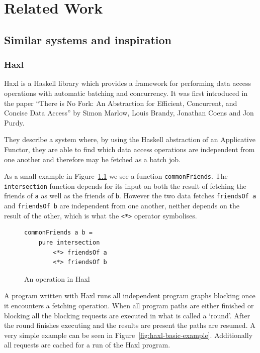 \chapter{Related Work}

\label{ch:related-work}

\section{Similar systems and inspiration}

\subsection{Haxl}

Haxl\cite{Haxl:library:link}\cite{Marlow:2014:NFA:2692915.2628144} is a Haskell\cite{HaskellLanguage} library which provides a framework for performing data access operations with automatic batching and concurrency. It was first introduced in the paper ``There is No Fork: An Abstraction for Efficient, Concurrent, and Concise Data Access''\cite{Marlow:2014:NFA:2692915.2628144} by Simon Marlow, Louis Brandy, Jonathan Coens and Jon Purdy.

They describe a system where, by using the Haskell abstraction of an Applicative Functor\cite{mcbride2008applicative}, they are able to find which data access operations are independent from one another and therefore may be fetched as a batch job.

As a small example in Figure~\ref{fig:operation-in-haxl} we see a function \texttt{commonFriends}.
The \texttt{intersection} function depends for its input on both the result of fetching the friends of \texttt{a} as well as the friends of \texttt{b}.
However the two data fetches \texttt{friendsOf a} and \texttt{friendsOf b} are independent from one another, neither depends on the result of the other, which is what the \texttt{<*>} operator symbolises.

\begin{figure}[h]
\begin{verbatim}
commonFriends a b =
    pure intersection
        <*> friendsOf a
        <*> friendsOf b
\end{verbatim}
\caption{An operation in Haxl}
\label{fig:operation-in-haxl}
\end{figure}

A program written with Haxl runs all independent program graphs blocking once it encounters a fetching operation.
When all program paths are either finished or blocking all the blocking requests are executed in what is called a `round'.
After the round finishes executing and the results are present the paths are resumed.
A very simple example can be seen in Figure~\ref{fig:haxl-basic-example}.
Additionally all requests are cached for a run of the Haxl program.

